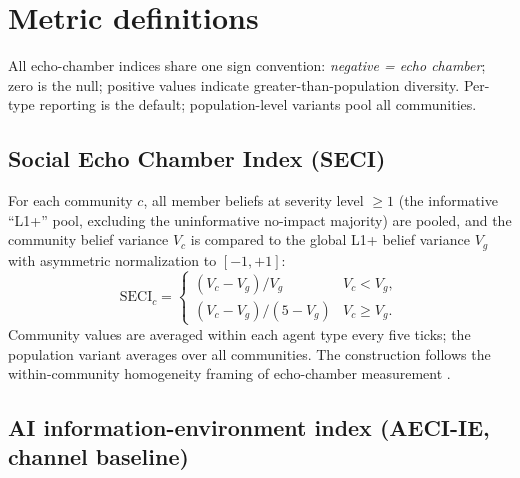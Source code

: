 \documentclass[11pt]{article}
\begin{document}
\section{Metric definitions}\label{si:metrics}

All echo-chamber indices share one sign convention: \emph{negative =
echo chamber}; zero is the null; positive values indicate
greater-than-population diversity. Per-type reporting is the default;
population-level variants pool all communities.

\subsection{Social Echo Chamber Index (SECI)}

For each community $c$, all member beliefs at severity level $\geq 1$
(the informative ``L1+'' pool, excluding the uninformative no-impact
majority) are pooled, and the community belief variance $V_c$ is compared
to the global L1+ belief variance $V_g$ with asymmetric normalization to
$[-1, +1]$:
\begin{equation}
  \mathrm{SECI}_c =
  \begin{cases}
    (V_c - V_g)/V_g & V_c < V_g,\\[4pt]
    (V_c - V_g)/(5 - V_g) & V_c \geq V_g.
  \end{cases}
  \label{eq:seci}
\end{equation}
Community values are averaged within each agent type every five ticks;
the population variant averages over all communities. The construction
follows the within-community homogeneity framing of echo-chamber
measurement \citep{cinelli2021echo}.

\subsection{AI information-environment index (AECI-IE, channel baseline)}
\end{document}
